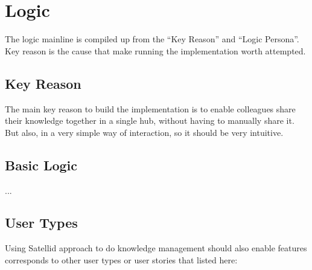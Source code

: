 \section{Logic}
\label{sec:logic}

The logic mainline is compiled up from the ``Key Reason'' and ``Logic Persona''.
Key reason is the cause that make running the implementation worth attempted.

\subsection{Key Reason}

The main key reason to build the implementation is to enable colleagues share their knowledge together in a single hub, without having to manually share it.
But also, in a very simple way of interaction, so it should be very intuitive.

\subsection{Basic Logic}

...

\subsection{User Types}

Using Satellid approach to do knowledge management should also enable features corresponds to other user types or user stories that listed here:

